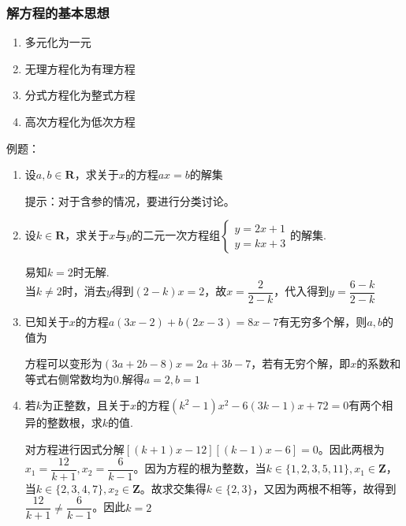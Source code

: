 \subsubsection*{解方程的基本思想}
\begin{enumerate}
    \item 多元化为一元
    \item 无理方程化为有理方程
    \item 分式方程化为整式方程
    \item 高次方程化为低次方程
\end{enumerate}
例题：
\begin{enumerate}
    \item 设$a, b \in \mathbf{R}$，求关于$x$的方程$ax = b$的解集
    \begin{jieda}
        提示：对于含参的情况，要进行分类讨论。
    \end{jieda}
    \item 设$k \in \mathbf{R}$，求关于$x$与$y$的二元一次方程组$
    \left \{ 
    \begin{array}{c}
         y = 2x+1  \\
         y = kx+3 
    \end{array}
    \right.$的解集.
    \begin{jieda}
        易知$k = 2$时无解. \\
        当$k \neq 2$时，消去$y$得到$(2-k)x = 2$，故$x = \dfrac{2}{2-k}$，代入得到$y = \dfrac{6-k}{2-k}$ 
    \end{jieda}
    \item 已知关于$x$的方程$a(3x-2)+b(2x-3) = 8x-7$有无穷多个解，则$a, b$的值为
    \begin{jieda}
        方程可以变形为$(3a+2b-8)x = 2a+3b-7$，若有无穷个解，即$x$的系数和等式右侧常数均为0.解得$a = 2, b = 1$
    \end{jieda}
    \item 若$k$为正整数，且关于$x$的方程$(k^2-1)x^2 - 6(3k-1)x+72=0$有两个相异的整数根，求$k$的值.
    \begin{jieda}
        对方程进行因式分解$[(k+1)x-12][(k-1)x-6] = 0$。因此两根为$x_1 = \dfrac{12}{k+1}, x_2 = \dfrac{6}{k-1}$。因为方程的根为整数，当$k \in \{1,2,3,5,11\}, x_1 \in \mathbf{Z}$，当$k \in \{2,3,4,7\}, x_2 \in \mathbf{Z}$。故求交集得$k \in \{2, 3\}$，又因为两根不相等，故得到$\dfrac{12}{k+1} \neq \dfrac{6}{k-1}$。因此$k = 2$
    \end{jieda}
\end{enumerate}
